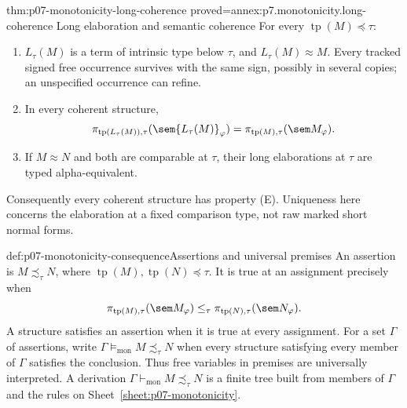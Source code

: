\begin{hblemma}{thm:p07-monotonicity-long-coherence}
 {proved=annex:p7.monotonicity.long-coherence}
 {Long elaboration and semantic coherence}
For every \(\operatorname{tp}(M)\preceq\tau\):
\begin{enumerate}
\item \(L_\tau(M)\) is a term of intrinsic type below \(\tau\), and
      \(L_\tau(M)\approx M\).
      Every tracked signed free occurrence survives with the same sign,
      possibly in several copies; an unspecified occurrence can refine.
\item In every coherent structure,
\[
 \pi_{\operatorname{tp}(L_\tau(M)),\tau}
        (\sem{L_\tau(M)}_\varphi)
 =
 \pi_{\operatorname{tp}(M),\tau}(\sem M_\varphi).
\]
\item If \(M\approx N\) and both are comparable at \(\tau\), their
      long elaborations at \(\tau\) are typed alpha-equivalent.
\end{enumerate}
Consequently every coherent structure has property (E).
Uniqueness here concerns the elaboration at a fixed comparison type,
not raw marked short normal forms.
\end{hblemma}

\begin{hbdefinition}{def:p07-monotonicity-consequence}{Assertions and universal premises}
An assertion is \(M\precsim_\tau N\), where
\(\operatorname{tp}(M),\operatorname{tp}(N)\preceq\tau\).
It is true at an assignment precisely when
\[
 \pi_{\operatorname{tp}(M),\tau}(\sem M_\varphi)
 \leq_\tau
 \pi_{\operatorname{tp}(N),\tau}(\sem N_\varphi).
\]
A structure satisfies an assertion when it is true at every assignment.
For a set \(\Gamma\) of assertions, write
\(\Gamma\models_{\mathrm{mon}}M\precsim_\tau N\) when every structure
satisfying every member of \(\Gamma\) satisfies the conclusion.
Thus free variables in premises are universally interpreted.
A derivation \(\Gamma\vdash_{\mathrm{mon}}M\precsim_\tau N\) is a finite
tree built from members of \(\Gamma\) and the rules on
Sheet~\ref{sheet:p07-monotonicity}.
\end{hbdefinition}


